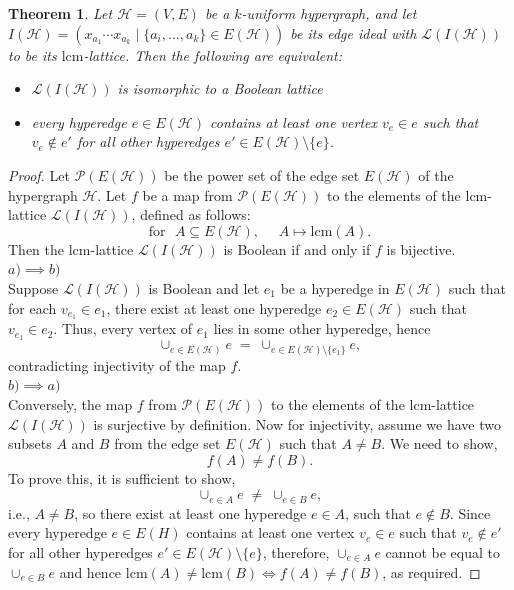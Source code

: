 \documentclass[11pt]{amsart}
\newcommand{\lcm}{\mathrm{lcm}}
\newcommand{\LC}{\mathcal{L}}
\theoremstyle{plain}
\numberwithin{lemma}{\DefaultNumberTheoremWithin}
\numberwithin{claim}{\DefaultNumberTheoremWithin}
\newtheorem{theorem}{Theorem}
\numberwithin{theorem}{\DefaultNumberTheoremWithin}
\numberwithin{corollary}{\DefaultNumberTheoremWithin}
\numberwithin{proposition}{\DefaultNumberTheoremWithin}
\numberwithin{conjecture}{\DefaultNumberTheoremWithin}
\theoremstyle{definition}
\numberwithin{definition}{\DefaultNumberTheoremWithin}
\theoremstyle{definition}
\numberwithin{question}{\DefaultNumberTheoremWithin}
\theoremstyle{definition}
\numberwithin{problem}{\DefaultNumberTheoremWithin}
\theoremstyle{remark}
\numberwithin{remark}
     {\DefaultNumberTheoremWithin}
\theoremstyle{remark}
\numberwithin{example}{\DefaultNumberTheoremWithin}
\def\H{\mathcal {H}}
\begin{document}
\begin{theorem}\label{Booleanhyper}
    Let \( \H = (V, E) \) be a $k$-uniform hypergraph, and let \( I(\H) = (x_{a_1}\cdots x_{a_k} \mid \{a_i,\ldots, a_k\} \in E(\H)) \) be its edge ideal with \( \LC(I(\H)) \) to be its $\lcm$-lattice. Then the following are equivalent:
\begin{itemize}
     \item[(a)] $\LC (I(\H))$ is isomorphic to a Boolean lattice
    \item[(b)] every hyperedge \( e \in E(\H) \) contains at least one vertex \( v_e \in e \) such that \( v_e \notin e' \) for all other hyperedges \( e' \in E(\H) \setminus \{e\} \).
\end{itemize}
\end{theorem}
\begin{proof}
    Let $\mathcal{P} (E(\H))$ be the power set of the edge set $E(\H)$ of the hypergraph $\H$. Let $f$ be a map from $\mathcal{P} (E(\H))$ to the elements of the $\lcm$-lattice \( \LC(I(\H)) \), defined as follows:
    \[
      \text{for}\,\,\,\, A \subseteq E(\H),\,\,\,\,\,\,\,\, A \mapsto \mathrm{lcm}(A).
    \]
    Then the $\lcm$-lattice \( \LC(I(\H)) \) is Boolean if and only if $f$ is bijective.\\
$a) \implies b)$\\
     Suppose \( \LC(I(\H)) \) is Boolean and let $e_1$ be a hyperedge in $E(\H)$ such that for each $v_{e_1}\in e_1$, there exist at least one hyperedge $e_2 \in E(\H)$ such that $v_{e_1}\in e_2$. Thus, every vertex of \( e_1 \) lies in some other hyperedge, hence
     \[
      \cup_{e \in E(\H)} e \;=\; \cup_{e \in E(\H) \setminus \{e_1\}} e,
     \]
     contradicting injectivity of the map $f$.\\
$b) \implies a)$\\
     Conversely, the map $f$ from $\mathcal{P} (E(\H))$ to the elements of the $\lcm$-lattice \( \LC(I(\H)) \) is surjective by definition. Now for injectivity, assume we have two subsets $A$ and $B$ from the edge set $E(\H)$ such that $A\not= B$. We need to show,
     \[
    f(A)\not= f(B).
    \] 
    To prove this, it is sufficient to show,
    \[
    \cup_{e \in A} e \;\not=\; \cup_{e \in B}e,
     \]
     i.e., $A\not= B$, so there exist at least one hyperedge $e \in A$, such that $e \not\in B$. Since every hyperedge \( e \in E(H) \) contains at least one vertex \( v_e \in e \) such that \( v_e \notin e' \) for all other hyperedges \( e' \in E(\H) \setminus \{e\} \), therefore, $\cup_{e \in A}e$ cannot be equal to $\cup_{e \in B}e$ and hence  $\lcm(A)\not= \lcm (B) \iff f(A)\not= f(B)$, as required. 
\end{proof}
\end{document}
